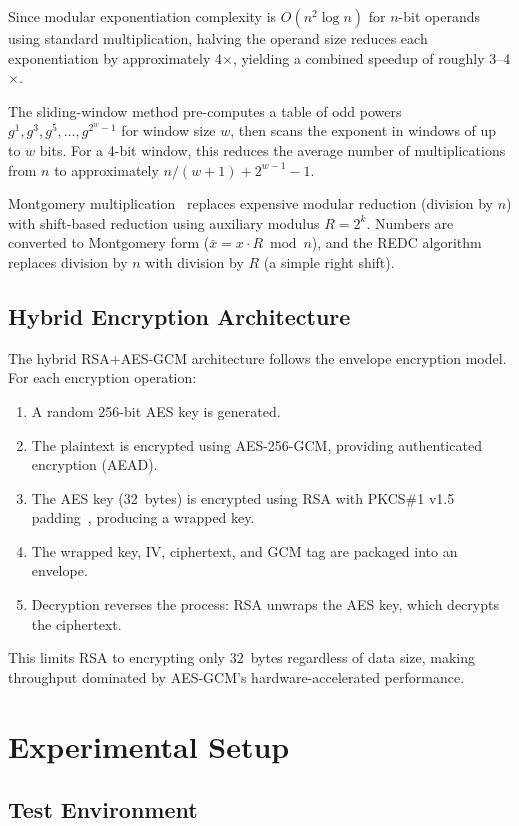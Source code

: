 \documentclass[conference]{IEEEtran}
\begin{document}
Since modular exponentiation complexity is $O(n^2 \log n)$ for $n$-bit operands using standard multiplication, halving the operand size reduces each exponentiation by approximately 4$\times$, yielding a combined speedup of roughly 3--4$\times$.

The sliding-window method pre-computes a table of odd powers $g^1, g^3, g^5, \ldots, g^{2^w - 1}$ for window size $w$, then scans the exponent in windows of up to $w$ bits. For a 4-bit window, this reduces the average number of multiplications from $n$ to approximately $n / (w + 1) + 2^{w-1} - 1$.

Montgomery multiplication~\cite{montgomery1985} replaces expensive modular reduction (division by $n$) with shift-based reduction using auxiliary modulus $R = 2^k$. Numbers are converted to Montgomery form ($\bar{x} = x \cdot R \bmod n$), and the REDC algorithm replaces division by $n$ with division by $R$ (a simple right shift).

\subsection{Hybrid Encryption Architecture}

The hybrid RSA+AES-GCM architecture follows the envelope encryption model. For each encryption operation:
\begin{enumerate}
    \item A random 256-bit AES key is generated.
    \item The plaintext is encrypted using AES-256-GCM, providing authenticated encryption (AEAD).
    \item The AES key (32~bytes) is encrypted using RSA with PKCS\#1 v1.5 padding~\cite{pkcs1_2016}, producing a wrapped key.
    \item The wrapped key, IV, ciphertext, and GCM tag are packaged into an envelope.
    \item Decryption reverses the process: RSA unwraps the AES key, which decrypts the ciphertext.
\end{enumerate}
This limits RSA to encrypting only 32~bytes regardless of data size, making throughput dominated by AES-GCM's hardware-accelerated performance.

\section{Experimental Setup}
\label{sec:setup}

\subsection{Test Environment}
\end{document}
